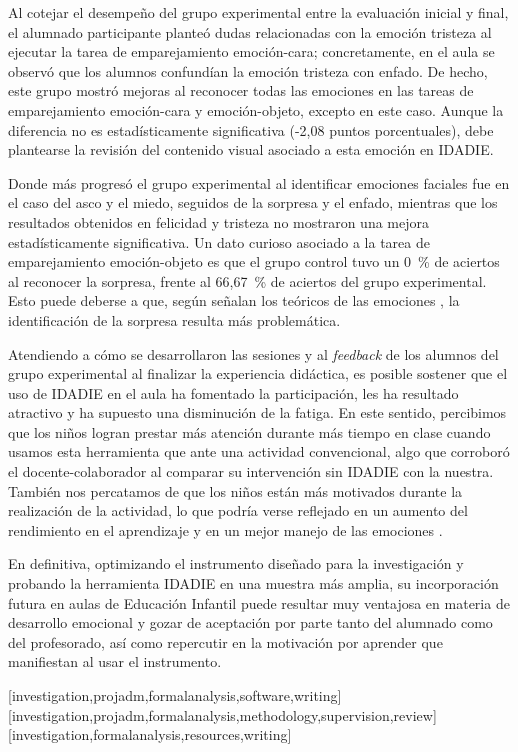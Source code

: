\documentclass[spanish]{textolivre}
\begin{document}
Al cotejar el desempeño del grupo experimental entre la evaluación inicial y final, el alumnado participante planteó dudas relacionadas con la emoción tristeza al ejecutar la tarea de emparejamiento emoción-cara; concretamente, en el aula se observó que los alumnos confundían la emoción tristeza con enfado. De hecho, este grupo mostró mejoras al reconocer todas las emociones en las tareas de emparejamiento emoción-cara y emoción-objeto, excepto en este caso. Aunque la diferencia no es estadísticamente significativa (-2,08 puntos porcentuales), debe plantearse la revisión del contenido visual asociado a esta emoción en IDADIE. 

Donde más progresó el grupo experimental al identificar emociones faciales fue en el caso del asco y el miedo, seguidos de la sorpresa y el enfado, mientras que los resultados obtenidos en felicidad y tristeza no mostraron una mejora estadísticamente significativa. Un dato curioso asociado a la tarea de emparejamiento emoción-objeto es que el grupo control tuvo un 0~\% de aciertos al reconocer la sorpresa, frente al 66,67~\% de aciertos del grupo experimental. Esto puede deberse a que, según señalan los teóricos de las emociones \cite{goleman_inteligencia_2021,izard_il_1977}, la identificación de la sorpresa resulta más problemática.

Atendiendo a cómo se desarrollaron las sesiones y al \textit{feedback} de los alumnos del grupo experimental al finalizar la experiencia didáctica, es posible sostener que el uso de IDADIE en el aula ha fomentado la participación, les ha resultado atractivo y ha supuesto una disminución de la fatiga. En este sentido, percibimos que los niños logran prestar más atención durante más tiempo en clase cuando usamos esta herramienta que ante una actividad convencional, algo que corroboró el docente-colaborador al comparar su intervención sin IDADIE con la nuestra. También nos percatamos de que los niños están más motivados durante la realización de la actividad, lo que podría verse reflejado en un aumento del rendimiento en el aprendizaje y en un mejor manejo de las emociones \cite{norman_emotion_2002,pagulayan_user-centered_2003}.

En definitiva, optimizando el instrumento diseñado para la investigación y probando la herramienta IDADIE en una muestra más amplia, su incorporación futura en aulas de Educación Infantil puede resultar muy ventajosa en materia de desarrollo emocional y gozar de aceptación por parte tanto del alumnado como del profesorado, así como repercutir en la motivación por aprender que manifiestan al usar el instrumento.



\printbibliography\label{sec-bib}
\begin{contributors}
[investigation,projadm,formalanalysis,software,writing]
[investigation,projadm,formalanalysis,methodology,supervision,review]
[investigation,formalanalysis,resources,writing]
\end{contributors}
\end{document}
